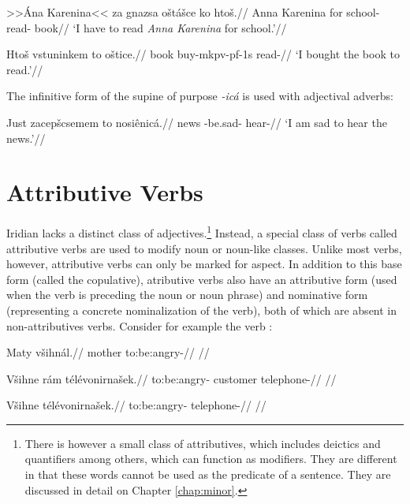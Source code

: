 	\pex
\begingl
\gla >>Ána Karenina<< za gnazsa o\v{s}tá\v{s}ce ko hto\v{s}.//
\glb Anna Karenina for school- read-  book//
\glft `I have to read \textit{Anna Karenina} for school.'//
\endgl
\xe

	\pex
\begingl
\gla Hto\v{s} vstuninkem to o\v{s}tice.//
\glb book buy-mk{pv-pf-1s}  read-//
\glft `I bought the book to read.'//
\endgl
\xe

\par The infinitive form of the supine of purpose \textit{-icá} is used with adjectival adverbs:

\pex
\begingl
\gla Just zacep\v{s}csemem to nosiênicá.//
\glb news -be.sad-  hear-//
\glft `I am sad to hear the news.'//
\endgl
\xe


\section{Attributive Verbs}

Iridian lacks a distinct class of adjectives.\footnote{There is however a small class of attributives, which includes deictics and quantifiers among others, which can function as modifiers. They are different in that these words cannot be used as the predicate of a sentence. They are discussed in detail on Chapter \ref{chap:minor}.} Instead, a special class of verbs called attributive verbs are used to modify noun or noun-like classes. Unlike most verbs, however, attributive verbs can only be marked for aspect. In addition to this base form (called the copulative), atributive verbs also have an attributive form (used when the verb is preceding the noun or noun phrase) and nominative form (representing a concrete nominalization of the verb), both of which are absent in non-attributives verbs. Consider for example the verb  :

\pex
\a
\begingl
\gla Maty v\v{s}ihn\'al.//
\glb mother to:be:angry-//
\glft {}//
\endgl

\a
\begingl
\gla V\v{s}ihne r\'am t\'el\'evonirna\v{s}ek.//
\glb to:be:angry- customer telephone-//
\glft {}//
\endgl

\a
\begingl
\gla V\v{s}ihne t\'el\'evonirna\v{s}ek.//
\glb to:be:angry- telephone-//
\glft {}//
\endgl

